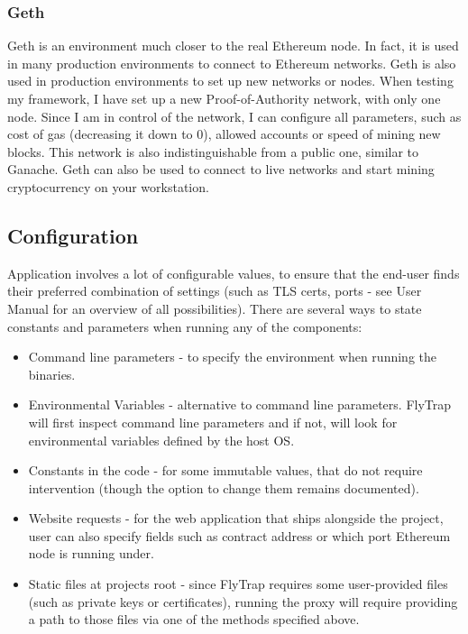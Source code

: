 \subsubsection{Geth}
Geth is an environment much closer to the real Ethereum node. In fact, it is used in many production environments to connect to Ethereum networks. Geth is also used in production environments to set up new networks or nodes. When testing my framework, I have set up a new Proof-of-Authority network, with only one node. Since I am in control of the network, I can configure all parameters, such as cost of gas (decreasing it down to 0), allowed accounts or speed of mining new blocks. This network is also indistinguishable from a public one, similar to Ganache. Geth can also be used to connect to live networks and start mining cryptocurrency on your workstation.

\subsection{Configuration}
Application involves a lot of configurable values, to ensure that the end-user finds their preferred combination of settings (such as TLS certs, ports - see User Manual for an overview of all possibilities). There are several ways to state constants and parameters when running any of the components:
\begin{itemize}
    \item Command line parameters - to specify the environment when running the binaries.
    \item Environmental Variables - alternative to command line parameters. FlyTrap will first inspect command line parameters and if not, will look for environmental variables defined by the host OS.
    \item Constants in the code - for some immutable values, that do not require intervention (though the option to change them remains documented).
    \item Website requests - for the web application that ships alongside the project, user can also specify fields such as contract address or which port Ethereum node is running under.
    \item Static files at projects root - since FlyTrap requires some user-provided files (such as private keys or certificates), running the proxy will require providing a path to those files via one of the methods specified above.
\end{itemize}
